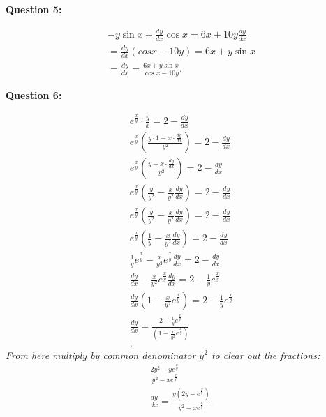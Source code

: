 \documentclass{report}
\begin{document}
    \bigbreak \noindent \bigbreak \noindent 
    \begin{Large}
        \textbf{Question 5:}
    \end{Large}
    \bigbreak \noindent 
    \bigbreak \noindent 
    \begin{align*}
      -y\sin{x}+\frac{dy}{dx}\cos{x} = 6x+10y \frac{dy}{dx} \\
      = \frac{dy}{dx}(cosx-10y) = 6x+y\sin{x} \\
      = \frac{dy}{dx} = \frac{6x+y\sin{x}}{\cos{x}-10y}
    .\end{align*}


    \bigbreak \noindent \bigbreak \noindent 
    \begin{Large}
        \textbf{Question 6:}
    \end{Large}
    \bigbreak \noindent 
    \bigbreak \noindent 
    \begin{align*}
      e^{\frac{x}{y}} \cdot \frac{y}{x} = 2 - \frac{dy}{dx} \\
      e^{\frac{x}{y}}(\frac{y \cdot 1 - x \cdot \frac{dy}{dx}}{y^{2}}) = 2 - \frac{dy}{dx} \\
      e^{\frac{x}{y}}(\frac{y - x \cdot \frac{dy}{dx}}{y^{2}}) = 2-\frac{dy}{dx}\\
      e^{\frac{x}{y}}(\frac{y}{y^{2}} - \frac{x}{y^{2}}\frac{dy}{dx}) = 2- \frac{dy}{dx}\\
      e^{\frac{x}{y}}(\frac{y}{y^{2}} - \frac{x}{y^{2}}\frac{dy}{dx}) = 2 - \frac{dy}{dx} \\
      e^{\frac{x}{y}}(\frac{1}{y} - \frac{x}{y^{2}}\frac{dy}{dx}) = 2 - \frac{dy}{dx} \\
      \frac{1}{y}e^{\frac{x}{y}}-\frac{x}{y^{2}}e^{\frac{x}{y}}\frac{dy}{dx} = 2-\frac{dy}{dx} \\
      \frac{dy}{dx} -\frac{x}{y^{2}}e^{\frac{x}{y}} \frac{dy}{dx} = 2 - \frac{1}{y}e^{\frac{x}{y}} \\
      \frac{dy}{dx}(1 -\frac{x}{y^{2}}e^{\frac{x}{y}}) = 2 - \frac{1}{y}e^{\frac{x}{y}} \\
      \frac{dy}{dx} = \frac{2- \frac{1}{y}e^{\frac{x}{y}}}{(1 -\frac{x}{y^{2}}e^{\frac{x}{y}})} \\
    .\end{align*}
    \textit{From here multiply by common denominator $y^{2}$ to clear out the fractions:}
    \begin{align*}
      \frac{2y^{2} - ye^{\frac{x}{y}}}{y^{2}-xe^{\frac{x}{y}}} \\
    \frac{dy}{dx} = \frac{y(2y-e^{\frac{x}{y}})}{y^{2}-xe^{\frac{x}{y}}}
    .\end{align*}
\end{document}
